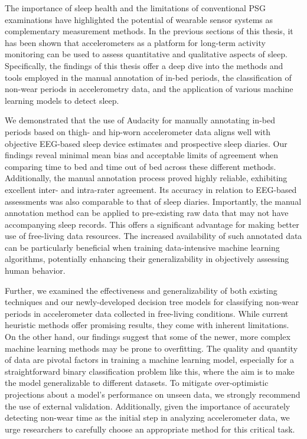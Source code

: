 \documentclass[
  10pt,
]{scrbook}
\begin{document}
The importance of sleep health and the limitations of conventional PSG
examinations have highlighted the potential of wearable sensor systems
as complementary measurement methods. In the previous sections of this
thesis, it has been shown that accelerometers as a platform for
long-term activity monitoring can be used to assess quantitative and
qualitative aspects of sleep. Specifically, the findings of this thesis
offer a deep dive into the methods and tools employed in the manual
annotation of in-bed periods, the classification of non-wear periods in
accelerometry data, and the application of various machine learning
models to detect sleep.

We demonstrated that the use of Audacity for manually annotating in-bed
periods based on thigh- and hip-worn accelerometer data aligns well with
objective EEG-based sleep device estimates and prospective sleep
diaries. Our findings reveal minimal mean bias and acceptable limits of
agreement when comparing time to bed and time out of bed across these
different methods. Additionally, the manual annotation process proved
highly reliable, exhibiting excellent inter- and intra-rater agreement.
Its accuracy in relation to EEG-based assessments was also comparable to
that of sleep diaries. Importantly, the manual annotation method can be
applied to pre-existing raw data that may not have accompanying sleep
records. This offers a significant advantage for making better use of
free-living data resources. The increased availability of such annotated
data can be particularly beneficial when training data-intensive machine
learning algorithms, potentially enhancing their generalizability in
objectively assessing human behavior.

Further, we examined the effectiveness and generalizability of both
existing techniques and our newly-developed decision tree models for
classifying non-wear periods in accelerometer data collected in
free-living conditions. While current heuristic methods offer promising
results, they come with inherent limitations. On the other hand, our
findings suggest that some of the newer, more complex machine learning
methods may be prone to overfitting. The quality and quantity of data
are pivotal factors in training a machine learning model, especially for
a straightforward binary classification problem like this, where the aim
is to make the model generalizable to different datasets. To mitigate
over-optimistic projections about a model's performance on unseen data,
we strongly recommend the use of external validation. Additionally,
given the importance of accurately detecting non-wear time as the
initial step in analyzing accelerometer data, we urge researchers to
carefully choose an appropriate method for this critical task.
\end{document}

